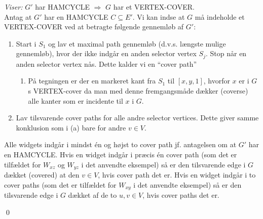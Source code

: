 \textit{Viser:} $G'$ har HAMCYCLE $\Longrightarrow$ $G$ har et VERTEX-COVER. \\

Antag at $G'$ har en HAMCYCLE $C \subseteq E'$. Vi kan indse at $G$ må indeholde et VERTEX-COVER ved at betragte følgende gennemløb af $G'$:
\begin{enumerate}
	\item Start i $S_1$ og lav et maximal path gennemløb (d.v.s. længste mulige gennemløb), hvor der ikke indgår en anden selector vertex $S_j$. Stop når en anden selector vertex nås. Dette kalder vi en ``cover path'' 
	\begin{enumerate}
		\item På tegningen er der en markeret kant fra $S_1$ til $[x,y,1]$, hvorfor $x$ er i $G$s VERTEX-cover da man med denne fremgangsmåde dækker (coverse) alle kanter som er incidente til $x$ i $G$.
	\end{enumerate} 
	\item Lav tilsvarende cover paths for alle andre selector vertices. Dette giver samme konklusion som i (a) bare for andre $v \in V$.  
\end{enumerate}
Alle widgets indgår i mindst én og højst to cover path jf. antagelsen om at $G'$ har en HAMCYCLE. Hvis en widget indgår i præcis én cover path (som det er tilfældet for $W_{xz}$ og $W_{yz}$ i det anvendte eksempel) så er den tilsvarende edge i $G$ dækket (covered) at den $v \in V$, hvis cover path det er. Hvis en widget indgår i to cover paths (som det er tilfældet for $W_{xy}$ i det anvendte eksempel) så er den tilsvarende edge i $G$ dækket af de to $u,v\in V$, hvis cover paths det er. 
\begin{flushright}
	\qed
\end{flushright}


